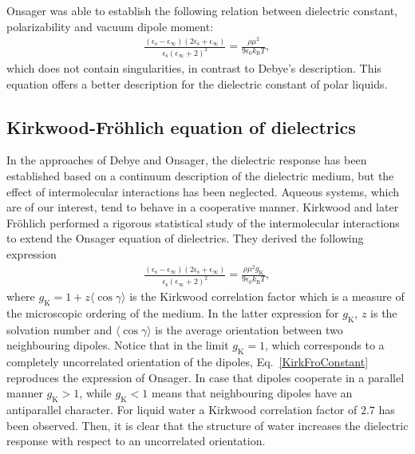 Onsager was able to establish the following relation between dielectric constant, polarizability and vacuum dipole moment:
\begin{eqnarray}
\frac{ (\epsilon_\text{s} - \epsilon_\infty)   (2 \epsilon_\text{s} + \epsilon_\infty)    }{\epsilon_\text{s} (\epsilon_\infty +2)^2  } = \frac{\rho \mu^2}{9 \epsilon_0 k_\text{B} T},
\label{OnsagerDielectricConstant2}
\end{eqnarray}
which does not contain singularities, in contrast to Debye's description. This equation offers a better description for the dielectric constant of polar liquids.\!\cite{Wilson1939,Buchner1999b,Buchner1999}



\subsection{Kirkwood-Fr\"ohlich equation of dielectrics}\label{KirkFrohSection}


In the approaches of Debye and Onsager, the dielectric response has been established based on a continuum description of the dielectric medium, but the effect of intermolecular interactions has been neglected. Aqueous systems, which are of our interest, tend to behave in a cooperative manner. Kirkwood and later Fr\"ohlich performed a rigorous statistical study of the intermolecular interactions to extend the Onsager equation of dielectrics.\!\cite{Kirkwood1939a,BOTTCHER1973,Frohlich1986} They derived the following expression
\begin{eqnarray}
\frac{ (\epsilon_\text{s} - \epsilon_\infty)   (2 \epsilon_\text{s} + \epsilon_\infty)    }{\epsilon_\text{s} (\epsilon_\infty +2)^2  } = \frac{\rho \mu^2 g_\text{K}}{9 \epsilon_0 k_\text{B} T},
\label{KirkFroConstant}
\end{eqnarray}
\noindent where $g_\text{K}= 1 + z \langle \cos \gamma \rangle$ is the Kirkwood correlation factor which is a measure of the microscopic ordering of the medium. In the latter expression for $g_\text{K}$, $z$ is the solvation number and $\langle \cos \gamma \rangle$ is the average orientation between two neighbouring dipoles. Notice that in the limit $g_\text{K} = 1$, which corresponds to a completely uncorrelated orientation of the dipoles, Eq.\ \ref{KirkFroConstant} reproduces the expression of Onsager. In case that dipoles cooperate in a parallel manner $g_\text{K} > 1$, while $g_\text{K} < 1$ means that neighbouring dipoles have an antiparallel character. For liquid water a Kirkwood correlation factor of $2.7$ has been observed.\!\cite{Buchner1999b} Then, it is clear that the structure of water increases the dielectric response with respect to an uncorrelated orientation.






